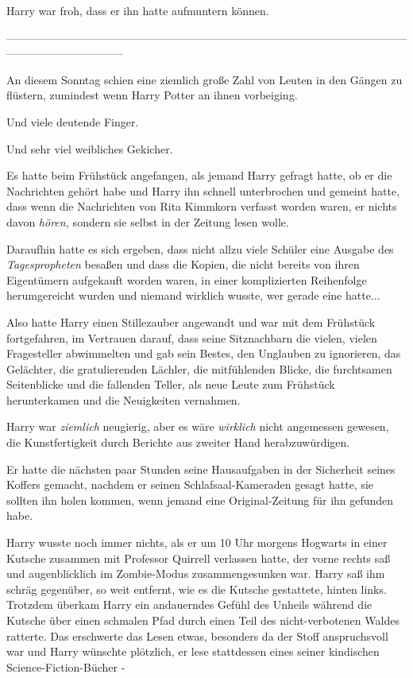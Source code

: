 {Harry war froh, dass er ihn hatte aufmuntern können.

--------------------------------------------------------------------------------------------------------------------------------------------

\hfill\break An diesem Sonntag schien eine ziemlich große Zahl von Leuten in den Gängen zu flüstern, zumindest wenn Harry Potter an ihnen vorbeiging.

Und viele deutende Finger.

Und sehr viel weibliches Gekicher.

Es hatte beim Frühstück angefangen, als jemand Harry gefragt hatte, ob er die Nachrichten gehört habe und Harry ihn schnell unterbrochen und gemeint hatte, dass wenn die Nachrichten von Rita Kimmkorn verfasst worden waren, er nichts davon \emph{hören,} sondern sie selbst in der Zeitung lesen wolle.

Daraufhin hatte es sich ergeben, dass nicht allzu viele Schüler eine Ausgabe des \emph{Tagespropheten} besaßen und dass die Kopien, die nicht bereits von ihren Eigentümern aufgekauft worden waren, in einer komplizierten Reihenfolge herumgereicht wurden und niemand wirklich wusste, wer gerade eine hatte...

Also hatte Harry einen Stillezauber angewandt und war mit dem Frühstück fortgefahren, im Vertrauen darauf, dass seine Sitznachbarn die vielen, vielen Fragesteller abwimmelten und gab sein Bestes, den Unglauben zu ignorieren, das Gelächter, die gratulierenden Lächler, die mitfühlenden Blicke, die furchtsamen Seitenblicke und die fallenden Teller, als neue Leute zum Frühstück herunterkamen und die Neuigkeiten vernahmen.

Harry war \emph{ziemlich} neugierig, aber es wäre \emph{wirklich} nicht angemessen gewesen, die Kunstfertigkeit durch Berichte aus zweiter Hand herabzuwürdigen.

Er hatte die nächsten paar Stunden seine Hausaufgaben in der Sicherheit seines Koffers gemacht, nachdem er seinen Schlafsaal-Kameraden gesagt hatte, sie sollten ihn holen kommen, wenn jemand eine Original-Zeitung für ihn gefunden habe.

Harry wusste noch immer nichts, als er um 10 Uhr morgens Hogwarts in einer Kutsche zusammen mit Professor Quirrell verlassen hatte, der vorne rechts saß und augenblicklich im Zombie-Modus zusammengesunken war. Harry saß ihm schräg gegenüber, so weit entfernt, wie es die Kutsche gestattete, hinten links. Trotzdem überkam Harry ein andauerndes Gefühl des Unheils während die Kutsche über einen schmalen Pfad durch einen Teil des nicht-verbotenen Waldes ratterte. Das erschwerte das Lesen etwas, besonders da der Stoff anspruchsvoll war und Harry wünschte plötzlich, er lese stattdessen eines seiner kindischen Science-Fiction-Bücher -

}
